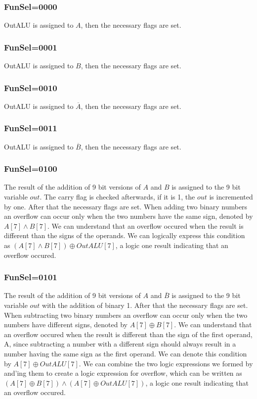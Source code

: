 \documentclass[pdftex,12pt,a4paper]{article}
\begin{document}
\subsubsection{FunSel=0000}
OutALU is assigned to $A$, then the necessary flags are set.
\subsubsection{FunSel=0001}
OutALU is assigned to $B$, then the necessary flags are set.
\subsubsection{FunSel=0010}
OutALU is assigned to $\overline{A}$, then the necessary flags are set.
\subsubsection{FunSel=0011}
OutALU is assigned to $\overline{B}$, then the necessary flags are set.
\subsubsection{FunSel=0100}
The result of the addition of 9 bit versions of $A$ and $B$ is assigned to the 9 bit variable $out$. The carry flag is checked 
afterwards, if it is 1, the $out$ is incremented by one. After that the necessary flags are set.
\newline
When adding two binary numbers an overflow can occur only when the two numbers have the same sign, denoted by $A[7]\land B[7]$. 
We can understand that an overflow occured when the result is different than the signs of the operands. We can logically express this 
condition as $(A[7]\land B[7])\oplus {OutALU[7]}$, a logic one result indicating that an overflow occured.
\subsubsection{FunSel=0101}
The result of the addition of 9 bit versions of $A$ and $\overline{B}$ is assigned to the 9 bit variable $out$ with the addition of
binary 1. After that the necessary flags are set.
\newline
When subtracting two binary numbers an overflow can occur only when the two numbers have different signs, denoted by $A[7]\oplus {B[7]}$.
We can understand that an overflow occured when the result is different than the sign of the first operand, A, since subtracting 
a number with a different sign should always result in a number having the same sign as the first operand. We can denote this 
condition by $A[7]\oplus {OutALU[7]}$. We can combine the two logic expressions we formed by and'ing them to create a logic expression 
for overflow, which can be written as $(A[7]\oplus {B[7]})\land(A[7]\oplus {OutALU[7]})$, a logic one result indicating that an 
overflow occured. 
\end{document}
